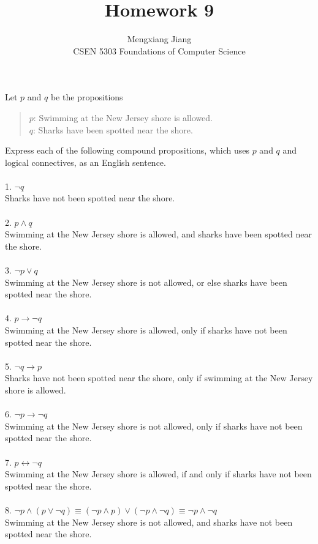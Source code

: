 \documentclass[12pt]{article}
\newenvironment{problem}[2][Problem]{\begin{trivlist}
\item[\hskip \labelsep {\bfseries #1}\hskip \labelsep {\bfseries #2.}]}{\end{trivlist}}
\begin{document}
 
 
\title{Homework 9}%
\author{Mengxiang Jiang\\ %
CSEN 5303 Foundations of Computer Science} %
 
\maketitle

\begin{problem}{1}
    Let $p$ and $q$ be the propositions
\begin{quote}
    $p$: Swimming at the New Jersey shore is allowed.\\
    $q$: Sharks have been spotted near the shore.
\end{quote}
Express each of the following compound propositions, which uses $p$ and $q$ and logical connectives, as an English sentence.\\\\
1. $\neg q$\\
Sharks have not been spotted near the shore.\\\\
2. $p\land q$\\
Swimming at the New Jersey shore is allowed, and sharks have been spotted near the shore.\\\\
3. $\neg p \lor q$\\
Swimming at the New Jersey shore is not allowed, or else sharks have been spotted near the shore.\\\\
4. $p\rightarrow \neg q$\\
Swimming at the New Jersey shore is allowed, only if sharks have not been spotted near the shore.\\\\
5. $\neg q \rightarrow p$\\
Sharks have not been spotted near the shore, only if swimming at the New Jersey shore is allowed.\\\\
6. $\neg p \rightarrow \neg q$\\
Swimming at the New Jersey shore is not allowed, only if sharks have not been spotted near the shore.\\\\
7. $p \leftrightarrow \neg q$\\
Swimming at the New Jersey shore is allowed, if and only if sharks have not been spotted near the shore.\\\\
8. $\neg p \land (p \lor \neg q) \equiv (\neg p \land p) \lor (\neg p \land \neg q) \equiv \neg p \land \neg q$ \\
Swimming at the New Jersey shore is not allowed, and sharks have not been spotted near the shore.

\end{problem}
\end{document}

